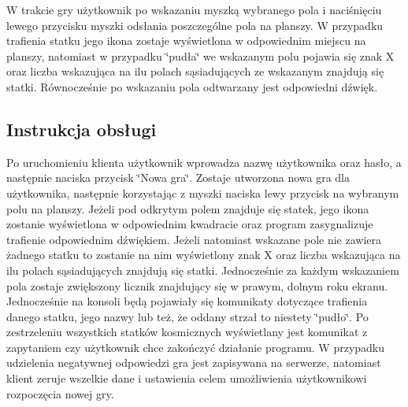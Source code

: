 W trakcie gry użytkownik po wskazaniu myszką wybranego pola i naciśnięciu lewego przycisku myszki odsłania poszczególne pola na planszy. W przypadku trafienia statku jego ikona zostaje wyświetlona w odpowiednim miejscu na planszy, natomiast w przypadku \char`\"{}pudła\char`\"{} we wskazanym polu pojawia się znak X oraz liczba wskazująca na ilu polach sąsiadujących ze wskazanym znajdują się statki. Równocześnie po wskazaniu pola odtwarzany jest odpowiedni dźwięk.

\subsection*{Instrukcja obsługi }

Po uruchomieniu klienta użytkownik wprowadza nazwę użytkownika oraz hasło, a następnie naciska przycisk \char`\"{}\+Nowa gra\char`\"{}. Zostaje utworzona nowa gra dla użytkownika, następnie korzystając z myszki naciska lewy przycisk na wybranym polu na planszy. Jeżeli pod odkrytym polem znajduje się statek, jego ikona zostanie wyświetlona w odpowiednim kwadracie oraz program zasygnalizuje trafienie odpowiednim dźwiękiem. Jeżeli natomiast wskazane pole nie zawiera żadnego statku to zostanie na nim wyświetlony znak X oraz liczba wskazująca na ilu polach sąsiadujących znajdują się statki. Jednocześnie za każdym wskazaniem pola zostaje zwiększony licznik znajdujący się w prawym, dolnym roku ekranu. Jednocześnie na konsoli będą pojawiały się komunikaty dotyczące trafienia danego statku, jego nazwy lub też, że oddany strzał to niestety \char`\"{}pudło\char`\"{}. Po zestrzeleniu wszystkich statków kosmicznych wyświetlany jest komunikat z zapytaniem czy użytkownik chce zakończyć działanie programu. W przypadku udzielenia negatywnej odpowiedzi gra jest zapisywana na serwerze, natomiast klient zeruje wszelkie dane i ustawienia celem umożliwienia użytkownikowi rozpoczęcia nowej gry.

 